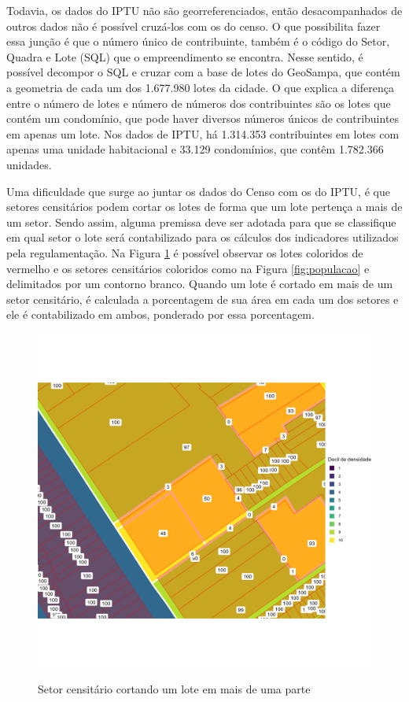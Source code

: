 Todavia, os dados do IPTU não são georreferenciados, então desacompanhados de outros dados não é possível cruzá-los com os do censo. O que possibilita fazer essa junção é que o número único de contribuinte, também é o código do Setor, Quadra e Lote (SQL) que o empreendimento se encontra. Nesse sentido, é possível decompor o SQL e cruzar com a base de lotes do GeoSampa, que contém a geometria de cada  um dos 1.677.980 lotes da cidade. O que explica a diferença entre o número de lotes e número de números dos contribuintes são os lotes que contém um condomínio, que pode haver diversos números únicos de contribuintes em apenas um lote. Nos dados de IPTU, há 1.314.353 contribuintes em lotes com apenas uma unidade habitacional e 33.129 condomínios, que contêm 1.782.366 unidades.

Uma dificuldade que surge ao juntar os dados do Censo com os do IPTU, é que setores censitários podem cortar os lotes de forma que um lote pertença a mais de um setor. Sendo assim, alguma premissa deve ser adotada para que se classifique em qual setor o lote será contabilizado para os cálculos dos indicadores utilizados pela regulamentação. Na Figura \ref{fig:lote-censo} é possível observar os lotes coloridos de vermelho e os setores censitários coloridos como na Figura \ref{fig:populacao} e delimitados por um contorno branco. Quando um lote é cortado em mais de um setor censitário, é calculada a porcentagem de sua área em cada um dos setores e ele é contabilizado em ambos, ponderado por essa porcentagem.


\begin{figure}[h]
    \centering
    \caption{Setor censitário cortando um lote em mais de uma parte}
    \includegraphics[width = .6\linewidth]{imagens/mapa_lote_corte.png}
    \label{fig:lote-censo}
\end{figure}